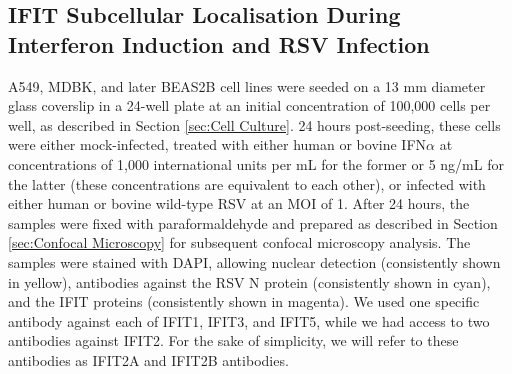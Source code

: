 \subsection{IFIT Subcellular Localisation During Interferon Induction and RSV Infection} \label{subsec:IFIT Subcellular Localisation During Interferon Induction and RSV Infection}
A549, MDBK, and later BEAS2B cell lines were seeded on a 13 mm diameter glass coverslip in a 24-well plate at an initial concentration of 100,000 cells per well, as described in Section \ref{sec:Cell Culture}. 24 hours post-seeding, these cells were either mock-infected, treated with either human or bovine IFN\(\alpha\) at concentrations of 1,000 international units per mL for the former or 5 ng/mL for the latter (these concentrations are equivalent to each other), or infected with either human or bovine wild-type RSV at an MOI of 1. After 24 hours, the samples were fixed with paraformaldehyde and prepared as described in Section \ref{sec:Confocal Microscopy} for subsequent confocal microscopy analysis. The samples were stained with DAPI, allowing nuclear detection (consistently shown in yellow), antibodies against the RSV N protein (consistently shown in cyan), and the IFIT proteins (consistently shown in magenta). We used one specific antibody against each of IFIT1, IFIT3, and IFIT5, while we had access to two antibodies against IFIT2. For the sake of simplicity, we will refer to these antibodies as IFIT2A and IFIT2B antibodies.

